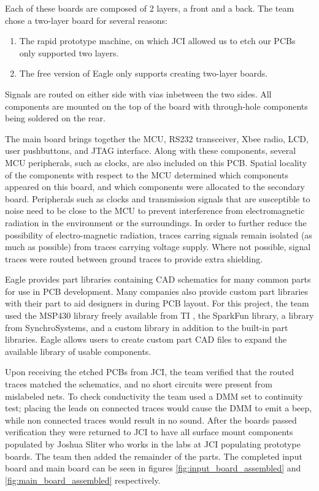 Each of these boards are composed of 2 layers, a front and a back. The team chose a two-layer board for several reasons:
\begin{enumerate}
\item The rapid prototype machine, on which \ac{JCI} allowed us to etch our \acp{PCB} only supported two layers.
\item The free version of Eagle only supports creating two-layer boards.
\end{enumerate}
Signals are routed on either side with vias inbetween the two sides. All components are mounted on the top of the board with through-hole components being soldered on the rear.

The main board brings together the \ac{MCU}, \ac{RS232} transceiver, Xbee radio, \ac{LCD}, user pushbuttons, and JTAG interface. Along with these components, several \ac{MCU} peripherals, such as clocks, are also included on this \ac{PCB}. Spatial locality of the components with respect to the \ac{MCU} determined which components appeared on this board, and which components were allocated to the secondary board. Peripherals such as clocks and transmission signals that are susceptible to noise need to be close to the \ac{MCU} to prevent interference from electromagnetic radiation in the environment or the surroundings. In order to further reduce the possibility of electro-magnetic radiation, traces carring signals remain isolated (as much as possible) from traces carrying voltage supply. Where not possible, signal traces were routed between ground traces to provide extra shielding.

Eagle provides part libraries containing \ac{CAD} schematics for many common parts for use in \ac{PCB} development. Many companies also provide custom part libraries with their part to aid designers in during \ac{PCB} layout. For this project, the team used the MSP430 library freely available from \ac{TI} , the SparkFun library, a library from SynchroSystems, and a custom library in addition to the built-in part libraries. Eagle allows users to create custom part \ac{CAD} files to expand the available library of usable components. 

Upon receiving the etched \acp{PCB} from \ac{JCI}, the team verified that the routed traces matched the schematics, and no short circuits were present from mislabeled nets. To check conductivity the team used a \ac{DMM} set to continuity test; placing the leads on connected traces would cause the \ac{DMM} to emit a beep, while non connected traces would result in no sound. After the boards passed verification they were returned to \ac{JCI} to have all surface mount components populated by Joshua Sliter who works in the labs at \ac{JCI} populating prototype boards. The team then added the remainder of the parts. The completed input board and main board can be seen in figures \ref{fig:input_board_assembled} and \ref{fig:main_board_assembled} respectively.

